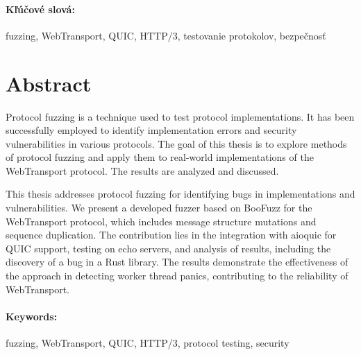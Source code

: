 \documentclass[12pt, twoside, openany]{book}
\begin{document}
\paragraph*{Kľúčové slová:} fuzzing, WebTransport, QUIC, HTTP/3, testovanie protokolov, bezpečnosť


\newpage 
\section*{Abstract}

Protocol fuzzing is a technique used to test protocol implementations. It has been successfully employed to identify implementation errors and security vulnerabilities in various protocols. The goal of this thesis is to explore methods of protocol fuzzing and apply them to real-world implementations of the WebTransport protocol. The results are analyzed and discussed.

This thesis addresses protocol fuzzing for identifying bugs in implementations and vulnerabilities. We present a developed fuzzer based on BooFuzz for the WebTransport protocol, which includes message structure mutations and sequence duplication. The contribution lies in the integration with aioquic for QUIC support, testing on echo servers, and analysis of results, including the discovery of a bug in a Rust library. The results demonstrate the effectiveness of the approach in detecting worker thread panics, contributing to the reliability of WebTransport.

\paragraph*{Keywords:} fuzzing, WebTransport, QUIC, HTTP/3, protocol testing, security


%
%
%
\end{document}
